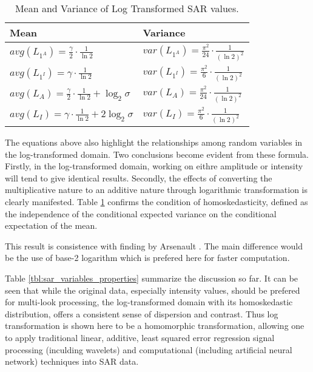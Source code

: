 \documentclass[journal]{IEEEtran}
\begin{document}
\begin{table}[!h]
\caption{ Mean and Variance of Log Transformed SAR values. }
\label{tbl:sar_log_domain_avg_var}
\normalsize
\centering
\begin{tabular}{|l|l|}
\hline
Mean & Variance \\
\hline
$avg(L_{1^A}) = \frac{ \gamma }{2} \cdot \frac{1}{\ln2}$ & $var(L_{1^A}) = \frac{ \pi ^2}{24} \cdot \frac{1}{(\ln2)^2}$ \\
$avg(L_{1^I}) = \gamma \cdot \frac{1}{\ln2} $ & $var(L_{1^I}) = \frac{ \pi ^2}{6} \cdot \frac{1}{(\ln2)^2} $ \\
$avg(L_A) = \frac{ \gamma }{2} \cdot \frac{1}{\ln2} + \log_2{\sigma}$ & $var(L_A) = \frac{ \pi ^2}{24} \cdot \frac{1}{(\ln2)^2}$ \\
$avg(L_I) = \gamma \cdot \frac{1}{\ln2} + 2 \log_2{\sigma}  $ & $ var(L_I) = \frac{ \pi ^2}{6} \cdot \frac{1}{(\ln2)^2}$ \\
\hline
\end{tabular}
\end{table}

The equations above also highlight the relationships among random variables in the log-transformed domain. 
Two conclusions become evident from these formula. 
Firstly, in the log-transformed domain, working on eithre amplitude or intensity will tend to give identical results. 
Secondly, the effects of converting the multiplicative nature to an additive nature through logarithmic transformation is clearly manifested. 
Table \ref{tbl:sar_log_domain_avg_var} confirms the condition of homoskedasticity,  defined as the independence of the conditional expected variance on the conditional expectation of the mean. 

This result is consistence with finding by Arsenault \cite{Arsenault_JOptSocAm_1976}.  
The main difference would be the use of base-2 logarithm which is prefered here for faster computation. 

Table \ref{tbl:sar_variables_properties} summarize the discussion so far. It can be seen that while the original data, especially intensity values, should be prefered for multi-look processing, the log-transformed domain with its homoskedastic distribution, offers a consistent sense of dispersion and contrast. Thus log transformation is shown here to be a homomorphic transformation, allowing one to apply traditional linear, additive, least squared error regression signal processing (inculding wavelets) and computational (including artificial neural network) techniques into SAR data.
\end{document}

